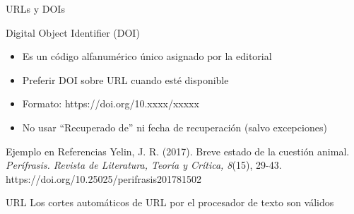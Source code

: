 \documentclass[spanish,aspectratio=169]{beamer}
\begin{document}
	\begin{frame}{URLs y DOIs}
		\begin{block}{Digital Object Identifier (DOI)}
			\begin{itemize}
				\item Es un código alfanumérico único asignado por la editorial
				\item Preferir DOI sobre URL cuando esté disponible
				\item Formato: https://doi.org/10.xxxx/xxxxx
				\item No usar ``Recuperado de'' ni fecha de recuperación (salvo excepciones)
			\end{itemize}
		\end{block}
		
		\begin{exampleblock}{Ejemplo en Referencias}
			\small
			Yelin, J. R. (2017). Breve estado de la cuestión animal. \textit{Perífrasis. Revista de Literatura, Teoría y Crítica, 8}(15), 29-43. https://doi.org/10.25025/perifrasis201781502
		\end{exampleblock}
		
		\begin{alertblock}{URL}
			Los cortes automáticos de URL por el procesador de texto son válidos
		\end{alertblock}
	\end{frame}
	
\end{document}
